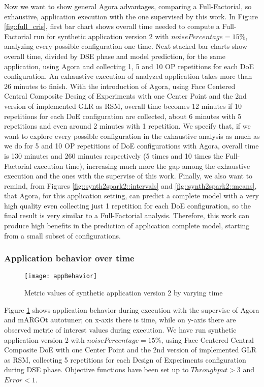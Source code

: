 Now we want to show general Agora advantages, comparing a Full-Factorial, so exhaustive, application execution with the one supervised by this work. In Figure \ref{fig::full_cris}, first bar chart shows overall time needed to compute a Full-Factorial run for synthetic application version 2 with $noisePercentage = 15\%$, analyzing every possible configuration one time. Next stacked bar charts show overall time, divided by DSE phase and model prediction, for the same application, using Agora and collecting 1, 5 and 10 OP repetitions for each DoE configuration. An exhaustive execution of analyzed application takes more than 26 minutes to finish. With the introduction of Agora, using Face Centered Central Composite Desing of Experiments with one Center Point and the 2nd version of implemented GLR as RSM, overall time becomes 12 minutes if 10 repetitions for each DoE configuration are collected, about 6 minutes with 5 repetitions and even around 2 minutes with 1 repetition. We specify that, if we want to explore every possible configuration in the exhaustive analysis as much as we do for 5 and 10 OP repetitions of DoE configurations with Agora, overall time is 130 minutes and 260 minutes respectively (5 times and 10 times the Full-Factorial execution time), increasing much more the gap among the exhaustive execution and the ones with the supervise of this work. Finally, we also want to remind, from Figures \ref{fig::synth2spark2::intervals} and \ref{fig::synth2spark2::means}, that Agora, for this application setting, can predict a complete model with a very high quality even collecting just 1 repetition for each DoE configuration, so the final result is very similar to a Full-Factorial analysis. Therefore, this work can produce high benefits in the prediction of application complete model, starting from a small subset of configurations.


\subsubsection{Application behavior over time}\label{behavior}

\begin{figure}[htb]

    \centering
    \texttt{[image: appBehavior]}
    \caption{Metric values of synthetic application version 2 by varying time}
    \label{fig::appBeh}
    
\end{figure}

Figure \ref{fig::appBeh} shows application behavior during execution with the supervise of Agora and mARGOt autotuner; on x-axis there is time, while on y-axis there are observed metric of interest values during execution. We have run synthetic application version 2 with $noisePercentage = 15\%$, using Face Centered Central Composite DoE with one Center Point and the 2nd version of implemented GLR as RSM, collecting 5 repetitions for each Design of Experiments configuration during DSE phase. Objective functions have been set up to $Throughput > 3$ and $Error < 1$.

